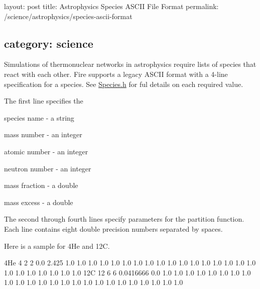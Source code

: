

 layout\+: post title\+: Astrophysics Species A\+S\+C\+II File Format permalink\+: /science/astrophysics/species-\/ascii-\/format \subsection*{category\+: science }

Simulations of thermonuclear networks in astrophysics require lists of species that react with each other. Fire supports a legacy A\+S\+C\+II format with a 4-\/line specification for a species. See \hyperlink{a00329_source}{Species.\+h} for ful details on each required value.

The first line specifies the


\begin{DoxyItemize}
\item species name -\/ a string
\item mass number -\/ an integer
\item atomic number -\/ an integer
\item neutron number -\/ an integer
\item mass fraction -\/ a double
\item mass excess -\/ a double
\end{DoxyItemize}

The second through fourth lines specify parameters for the partition function. Each line contains eight double precision numbers separated by spaces.

Here is a sample for 4\+He and 12C.


\begin{DoxyCode}
4He 4 2 2 0.0 2.425
1.0 1.0 1.0 1.0 1.0 1.0 1.0 1.0
1.0 1.0 1.0 1.0 1.0 1.0 1.0 1.0
1.0 1.0 1.0 1.0 1.0 1.0 1.0 1.0
12C 12 6 6 0.0416666 0.0
1.0 1.0 1.0 1.0 1.0 1.0 1.0 1.0
1.0 1.0 1.0 1.0 1.0 1.0 1.0 1.0
1.0 1.0 1.0 1.0 1.0 1.0 1.0 1.0
\end{DoxyCode}
 